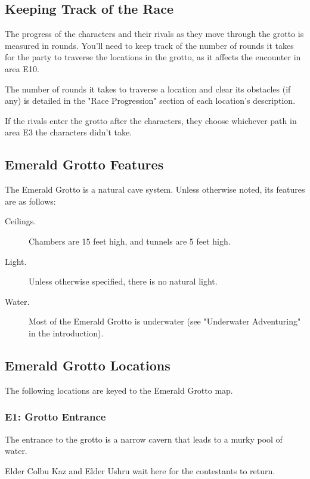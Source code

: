 \documentclass[10pt,a4paper,twoside,fancy,bg=print,twocolumn,openany,nodeprecatedcode]{dndbook}
\begin{document}
\subsection{Keeping Track of the Race}
The progress of the characters and their rivals as they move through the grotto is measured in rounds. You'll need to keep track of the number of rounds it takes for the party to traverse the locations in the grotto, as it affects the encounter in area E10.

The number of rounds it takes to traverse a location and clear its obstacles (if any) is detailed in the "Race Progression" section of each location's description.

If the rivals enter the grotto after the characters, they choose whichever path in area E3 the characters didn't take.

\subsection{Emerald Grotto Features}
The Emerald Grotto is a natural cave system. Unless otherwise noted, its features are as follows:


\begin{description}
\item[Ceilings.]
Chambers are 15 feet high, and tunnels are 5 feet high.
\item[Light.]
Unless otherwise specified, there is no natural light.
\item[Water.]
Most of the Emerald Grotto is underwater (see "Underwater Adventuring" in the introduction).
\end{description}

\subsection{Emerald Grotto Locations}
The following locations are keyed to the Emerald Grotto map.

\subsubsection{E1: Grotto Entrance}
\begin{DndReadAloud}{}
The entrance to the grotto is a narrow cavern that leads to a murky pool of water.

\end{DndReadAloud}

Elder Colbu Kaz and Elder Ushru wait here for the contestants to return.
\end{document}
